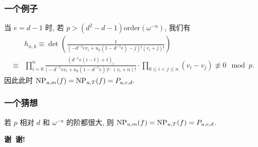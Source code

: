 \documentclass[aspectratio=169,handout]{ctexbeamer}
\begin{document}
\begin{frame}
\frametitle{一个例子}
当 $e=d-1$ 时, 若 $p>(d^2-d-1)\mathrm{order}(\omega^{-u})$, 我们有
	\[\begin{split}
	&h_{n,k}\equiv\det\left(\frac{1}{(-d^{-1}ev_i+u_k(1-d^{-1}e)-j)!(v_i+j)!}\right)\\
\equiv &\prod_{i=0}^n \frac{\left(d^{-1}e(i-t)+t\right)_i}{\bigl(-d^{-1}ev_i+u_k(1-d^{-1}e)\bigr)!\cdot(v_i+n)!} \cdot \prod_{0\le i<j\le n}(v_i-v_j)\not\equiv 0\mod p.
\end{split}\]
因此此时 ${\mathrm{NP}}_{u,m}(f)={\mathrm{NP}}_{u,T}(f)=P_{u,e,d}.$
\end{frame}


\begin{frame}
\frametitle{一个猜想}
\begin{conjecture}
若 $p$ 相对 $d$ 和 $\omega^{-u}$ 的阶都很大, 则 ${\mathrm{NP}}_{u,m}(f)={\mathrm{NP}}_{u,T}(f)=P_{u,e,d}$.
\end{conjecture}
\end{frame}



{
	\setnaviboxempty
	\begin{frame}
		\begin{center}
			\huge \textbf{谢~谢!}
		\end{center}
	\end{frame}
}
\end{document}
